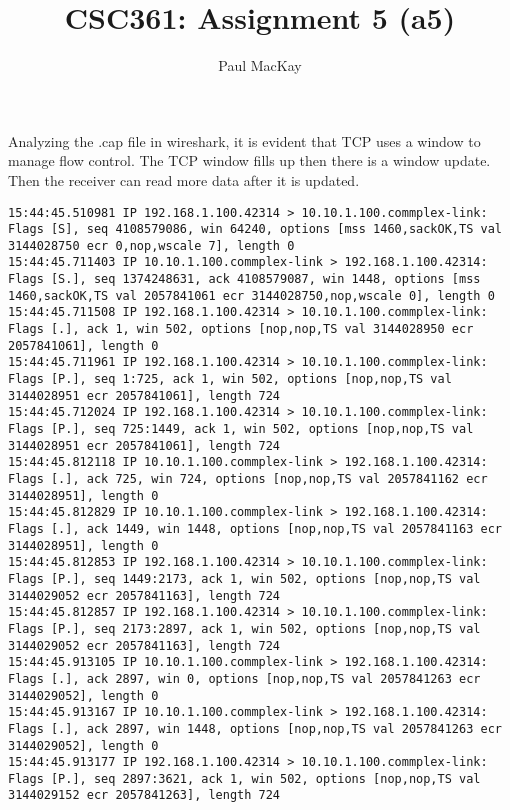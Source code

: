 \documentclass{article}
\title{CSC361: Assignment 5 (a5)}
\author{Paul MacKay}
\begin{document}
\maketitle

\section{}
Analyzing the .cap file in wireshark, it is evident that TCP uses a window to manage
flow control. The TCP window fills up then there is a window update. Then the receiver can
read more data after it is updated.
{\small
\begin{lstlisting}
15:44:45.510981 IP 192.168.1.100.42314 > 10.10.1.100.commplex-link: Flags [S], seq 4108579086, win 64240, options [mss 1460,sackOK,TS val 3144028750 ecr 0,nop,wscale 7], length 0
15:44:45.711403 IP 10.10.1.100.commplex-link > 192.168.1.100.42314: Flags [S.], seq 1374248631, ack 4108579087, win 1448, options [mss 1460,sackOK,TS val 2057841061 ecr 3144028750,nop,wscale 0], length 0
15:44:45.711508 IP 192.168.1.100.42314 > 10.10.1.100.commplex-link: Flags [.], ack 1, win 502, options [nop,nop,TS val 3144028950 ecr 2057841061], length 0
15:44:45.711961 IP 192.168.1.100.42314 > 10.10.1.100.commplex-link: Flags [P.], seq 1:725, ack 1, win 502, options [nop,nop,TS val 3144028951 ecr 2057841061], length 724
15:44:45.712024 IP 192.168.1.100.42314 > 10.10.1.100.commplex-link: Flags [P.], seq 725:1449, ack 1, win 502, options [nop,nop,TS val 3144028951 ecr 2057841061], length 724
15:44:45.812118 IP 10.10.1.100.commplex-link > 192.168.1.100.42314: Flags [.], ack 725, win 724, options [nop,nop,TS val 2057841162 ecr 3144028951], length 0
15:44:45.812829 IP 10.10.1.100.commplex-link > 192.168.1.100.42314: Flags [.], ack 1449, win 1448, options [nop,nop,TS val 2057841163 ecr 3144028951], length 0
15:44:45.812853 IP 192.168.1.100.42314 > 10.10.1.100.commplex-link: Flags [P.], seq 1449:2173, ack 1, win 502, options [nop,nop,TS val 3144029052 ecr 2057841163], length 724
15:44:45.812857 IP 192.168.1.100.42314 > 10.10.1.100.commplex-link: Flags [P.], seq 2173:2897, ack 1, win 502, options [nop,nop,TS val 3144029052 ecr 2057841163], length 724
15:44:45.913105 IP 10.10.1.100.commplex-link > 192.168.1.100.42314: Flags [.], ack 2897, win 0, options [nop,nop,TS val 2057841263 ecr 3144029052], length 0
15:44:45.913167 IP 10.10.1.100.commplex-link > 192.168.1.100.42314: Flags [.], ack 2897, win 1448, options [nop,nop,TS val 2057841263 ecr 3144029052], length 0
15:44:45.913177 IP 192.168.1.100.42314 > 10.10.1.100.commplex-link: Flags [P.], seq 2897:3621, ack 1, win 502, options [nop,nop,TS val 3144029152 ecr 2057841263], length 724

\end{lstlisting}}
\end{document}
